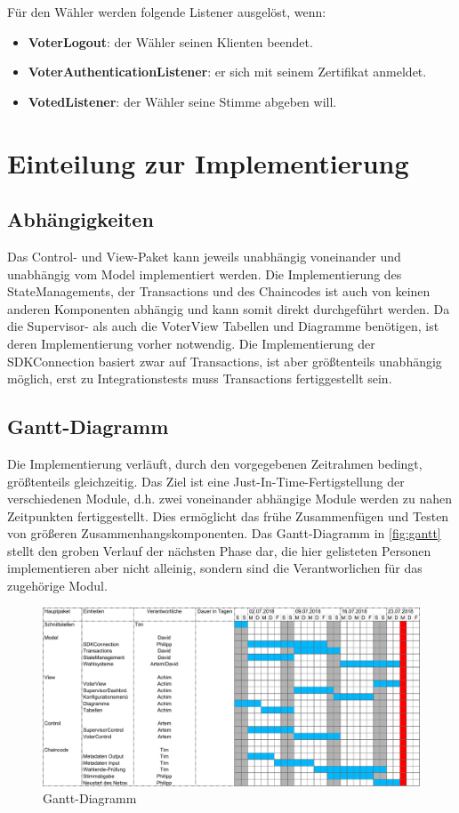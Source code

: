 \documentclass[parskip=full]{scrartcl}
\newcommand{\fakeparagraph}[1]{\textbf{#1}}
\begin{document}
	Für den Wähler werden folgende Listener ausgelöst, wenn:
	\begin{itemize}
		\item\fakeparagraph{VoterLogout}: der Wähler seinen Klienten beendet.
		\item\fakeparagraph{VoterAuthenticationListener}: er sich mit seinem Zertifikat anmeldet.
		\item\fakeparagraph{VotedListener}: der Wähler seine Stimme abgeben will.
	\end{itemize}
  
  	\section{Einteilung zur Implementierung}
  	\subsection{Abhängigkeiten}
  	Das Control- und View-Paket kann jeweils unabhängig voneinander und unabhängig vom Model implementiert werden. Die Implementierung des StateManagements, der Transactions und des Chaincodes ist auch von keinen anderen Komponenten abhängig und kann somit direkt durchgeführt werden. Da die Supervisor- als auch die VoterView Tabellen und Diagramme benötigen, ist deren Implementierung vorher notwendig. Die Implementierung der SDKConnection basiert zwar auf Transactions, ist aber größtenteils unabhängig möglich, erst zu Integrationstests muss Transactions fertiggestellt sein.
  	
	\subsection{Gantt-Diagramm}
	Die Implementierung verläuft, durch den vorgegebenen Zeitrahmen bedingt, größtenteils gleichzeitig. Das Ziel ist eine Just-In-Time-Fertigstellung der verschiedenen Module, d.h. zwei voneinander abhängige Module werden zu nahen Zeitpunkten fertiggestellt. Dies ermöglicht das frühe Zusammenfügen und Testen von größeren Zusammenhangskomponenten. Das Gantt-Diagramm in \autoref{fig:gantt} stellt den groben Verlauf der nächsten Phase dar, die hier gelisteten Personen implementieren aber nicht alleinig, sondern sind die Verantworlichen für das zugehörige Modul.
	\begin{figure}[!h]
		\centering
		\includegraphics[width=\textwidth]{pictures/Gantt.pdf}
		\caption{Gantt-Diagramm}
		\label{fig:gantt}
	\end{figure}
\end{document}
